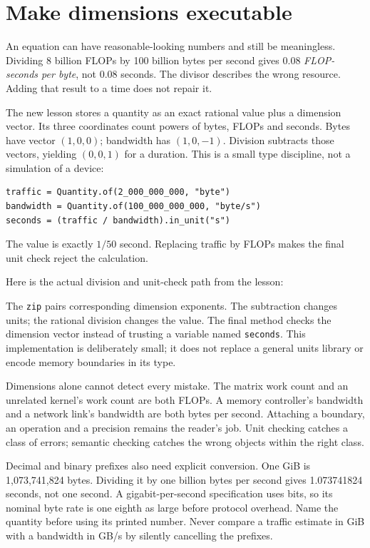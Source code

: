 \section{Make dimensions executable}
An equation can have reasonable-looking numbers and still be meaningless.
Dividing 8 billion FLOPs by 100 billion bytes per second gives
0.08 \emph{FLOP-seconds per byte}, not 0.08 seconds. The divisor describes
the wrong resource. Adding that result to a time does not repair it.

The new lesson stores a quantity as an exact rational value plus a dimension
vector. Its three coordinates count powers of bytes, FLOPs and seconds.
Bytes have vector $(1,0,0)$; bandwidth has $(1,0,-1)$.
Division subtracts those vectors, yielding $(0,0,1)$ for a duration.
This is a small type discipline, not a simulation of a device:
\begin{verbatim}
traffic = Quantity.of(2_000_000_000, "byte")
bandwidth = Quantity.of(100_000_000_000, "byte/s")
seconds = (traffic / bandwidth).in_unit("s")
\end{verbatim}
The value is exactly $1/50$ second. Replacing traffic by FLOPs makes
the final unit check reject the calculation.

Here is the actual division and unit-check path from the lesson:
\begin{minipage}{\linewidth}
\end{minipage}
The \texttt{zip} pairs corresponding dimension exponents.
The subtraction changes units; the rational division changes the value.
The final method checks the dimension vector instead of trusting a
variable named \texttt{seconds}. This implementation is deliberately
small; it does not replace a general units library or encode memory
boundaries in its type.

Dimensions alone cannot detect every mistake. The matrix work count and
an unrelated kernel's work count are both FLOPs. A memory controller's
bandwidth and a network link's bandwidth are both bytes per second.
Attaching a boundary, an operation and a precision remains the reader's
job. Unit checking catches a class of errors; semantic checking catches
the wrong objects within the right class.

Decimal and binary prefixes also need explicit conversion. One GiB is
1,073,741,824 bytes. Dividing it by one billion bytes per second gives
1.073741824 seconds, not one second. A gigabit-per-second specification
uses bits, so its nominal byte rate is one eighth as large before
protocol overhead. Name the quantity before using its printed number.
Never compare a traffic estimate in GiB with a bandwidth in GB/s by
silently cancelling the prefixes.

